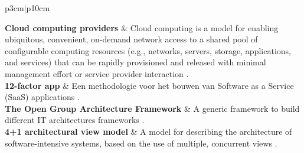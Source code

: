 \documentclass[
11pt, %
english, %
singlespacing, %
headsepline, %
]{formatting} %
\begin{document}
\begin{begrippen}{p{3cm}|p{10cm}}
	
	
	
	
	\textbf{Cloud computing providers} & Cloud computing is a model for enabling ubiquitous, convenient, on-demand network access to a shared pool of configurable computing resources (e.g., networks, servers, storage, applications, and services) that can be rapidly provisioned and released with minimal management effort or service provider interaction \parencite{CloudComputing}.\\
	
	\textbf{12-factor app} & Een methodologie voor het bouwen van Software as a Service (SaaS) applications \parencite{12Factor}. \\
	
	\textbf{The Open Group Architecture Framework} & A generic framework to build different IT architectures frameworks \parencite{TOGAF}.\\
	
	\textbf{4+1 architectural view model} & A model for describing the architecture of software-intensive systems, based on the use of multiple, concurrent views \parencite{4plus1}. \\
\end{begrippen}


\end{document}

